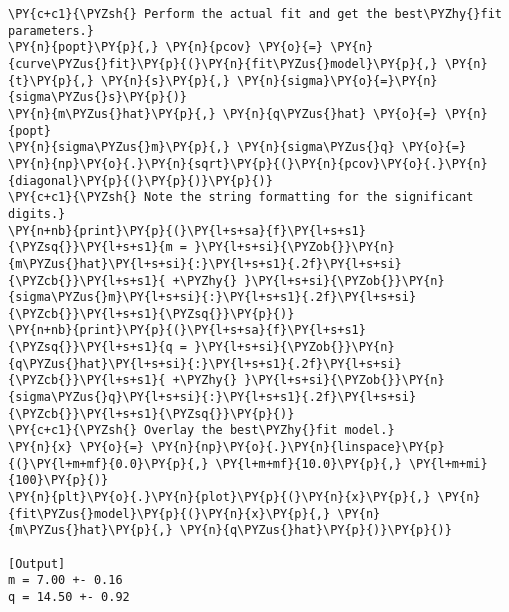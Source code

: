 \begin{Verbatim}[label=\makebox{\href{https://github.com/unipi-physics-labs/statnotes/tree/main/snippy/fit_linear.py}{https://github.com/.../fit\_linear.py}},commandchars=\\\{\}]
\PY{c+c1}{\PYZsh{} Perform the actual fit and get the best\PYZhy{}fit parameters.}
\PY{n}{popt}\PY{p}{,} \PY{n}{pcov} \PY{o}{=} \PY{n}{curve\PYZus{}fit}\PY{p}{(}\PY{n}{fit\PYZus{}model}\PY{p}{,} \PY{n}{t}\PY{p}{,} \PY{n}{s}\PY{p}{,} \PY{n}{sigma}\PY{o}{=}\PY{n}{sigma\PYZus{}s}\PY{p}{)}
\PY{n}{m\PYZus{}hat}\PY{p}{,} \PY{n}{q\PYZus{}hat} \PY{o}{=} \PY{n}{popt}
\PY{n}{sigma\PYZus{}m}\PY{p}{,} \PY{n}{sigma\PYZus{}q} \PY{o}{=} \PY{n}{np}\PY{o}{.}\PY{n}{sqrt}\PY{p}{(}\PY{n}{pcov}\PY{o}{.}\PY{n}{diagonal}\PY{p}{(}\PY{p}{)}\PY{p}{)}
\PY{c+c1}{\PYZsh{} Note the string formatting for the significant digits.}
\PY{n+nb}{print}\PY{p}{(}\PY{l+s+sa}{f}\PY{l+s+s1}{\PYZsq{}}\PY{l+s+s1}{m = }\PY{l+s+si}{\PYZob{}}\PY{n}{m\PYZus{}hat}\PY{l+s+si}{:}\PY{l+s+s1}{.2f}\PY{l+s+si}{\PYZcb{}}\PY{l+s+s1}{ +\PYZhy{} }\PY{l+s+si}{\PYZob{}}\PY{n}{sigma\PYZus{}m}\PY{l+s+si}{:}\PY{l+s+s1}{.2f}\PY{l+s+si}{\PYZcb{}}\PY{l+s+s1}{\PYZsq{}}\PY{p}{)}
\PY{n+nb}{print}\PY{p}{(}\PY{l+s+sa}{f}\PY{l+s+s1}{\PYZsq{}}\PY{l+s+s1}{q = }\PY{l+s+si}{\PYZob{}}\PY{n}{q\PYZus{}hat}\PY{l+s+si}{:}\PY{l+s+s1}{.2f}\PY{l+s+si}{\PYZcb{}}\PY{l+s+s1}{ +\PYZhy{} }\PY{l+s+si}{\PYZob{}}\PY{n}{sigma\PYZus{}q}\PY{l+s+si}{:}\PY{l+s+s1}{.2f}\PY{l+s+si}{\PYZcb{}}\PY{l+s+s1}{\PYZsq{}}\PY{p}{)}
\PY{c+c1}{\PYZsh{} Overlay the best\PYZhy{}fit model.}
\PY{n}{x} \PY{o}{=} \PY{n}{np}\PY{o}{.}\PY{n}{linspace}\PY{p}{(}\PY{l+m+mf}{0.0}\PY{p}{,} \PY{l+m+mf}{10.0}\PY{p}{,} \PY{l+m+mi}{100}\PY{p}{)}
\PY{n}{plt}\PY{o}{.}\PY{n}{plot}\PY{p}{(}\PY{n}{x}\PY{p}{,} \PY{n}{fit\PYZus{}model}\PY{p}{(}\PY{n}{x}\PY{p}{,} \PY{n}{m\PYZus{}hat}\PY{p}{,} \PY{n}{q\PYZus{}hat}\PY{p}{)}\PY{p}{)}

[Output]
m = 7.00 +- 0.16
q = 14.50 +- 0.92
\end{Verbatim}
